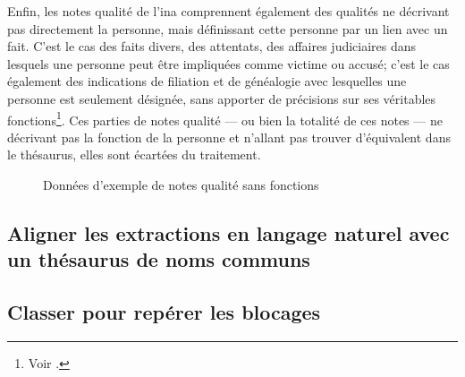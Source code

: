 Enfin, les notes qualité de l'\ac{ina} comprennent également des qualités ne décrivant pas directement la personne, mais définissant cette personne par un lien avec un fait. C'est le cas des faits divers, des attentats, des affaires judiciaires dans lesquels une personne peut être impliquées comme victime ou accusé; c'est le cas également des indications de filiation et de généalogie avec lesquelles une personne est seulement désignée, sans apporter de précisions sur ses véritables fonctions\footnote{Voir .}. Ces parties de notes qualité --- ou bien la totalité de ces notes --- ne décrivant pas la fonction de la personne et n'allant pas trouver d'équivalent dans le thésaurus, elles sont écartées du traitement.
\begin{figure}[!h]
	\centering
	\caption{Données d'exemple de notes qualité sans fonctions}
	\label{exemple_NQ_sans_fonctions}
\end{figure}

\subsection{\label{I-C-3-b}Aligner les extractions en langage naturel avec un thésaurus de noms communs}

\subsection{\label{I-C-3-c}Classer pour repérer les blocages}

